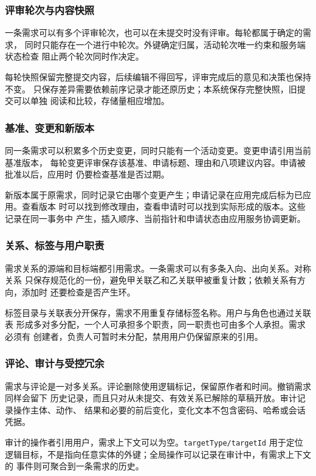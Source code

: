 \documentclass[UTF8,a4paper,12pt]{ctexart}
\newcommand{\code}[1]{\allowbreak\nolinkurl{#1}\allowbreak}
\begin{document}
\subsubsection{评审轮次与内容快照}
一条需求可以有多个评审轮次，也可以在未提交时没有评审。每轮都属于确定的需求，
同时只能存在一个进行中轮次。外键确定归属，活动轮次唯一约束和服务端状态检查
阻止两个轮次同时作决定。

每轮快照保留完整提交内容，后续编辑不得回写，评审完成后的意见和决策也保持不变。
只保存差异需要依赖前序记录才能还原历史；本系统保存完整快照，旧提交可以单独
阅读和比较，存储量相应增加。

\subsubsection{基准、变更和新版本}
同一条需求可以积累多个历史变更，同时只能有一个活动变更。变更申请引用当前基准版本，
每轮变更评审保存该基准、申请标题、理由和八项建议内容。申请被批准以后，应用时
仍要检查基准是否过期。

新版本属于原需求，同时记录它由哪个变更产生；申请记录在应用完成后标为已应用。查看版本
时可以找到修改理由，查看申请时可以找到实际形成的版本。这些记录在同一事务中
产生，插入顺序、当前指针和申请状态由应用服务协调更新。

\subsubsection{关系、标签与用户职责}
需求关系的源端和目标端都引用需求。一条需求可以有多条入向、出向关系。对称关系
只保存规范化的一份，避免甲关联乙和乙关联甲被重复计数；依赖关系有方向，添加时
还要检查是否产生环。

标签目录与关联表分开保存，需求不用重复存储标签名称。用户与角色也通过关联表
形成多对多分配，一个人可承担多个职责，同一职责也可由多个人承担。需求必须有
创建者，负责人可暂时未分配，禁用用户仍保留原来的引用。

\subsubsection{评论、审计与受控冗余}
需求与评论是一对多关系。评论删除使用逻辑标记，保留原作者和时间。撤销需求同样会留下
历史记录，而且只对从未提交、有效关系已解除的草稿开放。审计记录操作主体、动作、
结果和必要的前后变化，变化文本不包含密码、哈希或会话凭据。

审计的操作者引用用户，需求上下文可以为空。\code{targetType/targetId} 用于定位
逻辑目标，不是指向任意实体的外键；全局操作可以记录在审计中，有需求上下文的
事件则可聚合到一条需求的历史。
\end{document}
